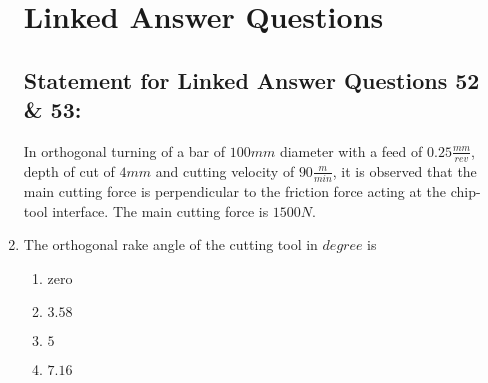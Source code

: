 \documentclass[journal]{IEEEtran}
\numberwithin{equation}{enumi}
\numberwithin{figure}{enumi}
\begin{document}
\begin{enumerate}
    \section{Linked Answer Questions}
    \subsection{Statement for Linked Answer Questions 52 \& 53:}
    In orthogonal turning of a bar of $100 mm$ diameter with a feed of $0.25 \frac{mm}{rev}$, depth of cut of $4 mm$ and cutting velocity of $90 \frac{m}{min}$, it is observed that the main  cutting force is perpendicular to the friction force acting at the chip-tool interface. The main  cutting force is $1500 N$.\\

    \item 
    The orthogonal rake angle of the cutting tool in $degree$ is
    \begin{multicols}{4}
        \begin{enumerate}
            \item zero
            \item $3.58$
            \item $5$
            \item $7.16$
        \end{enumerate}
    \end{multicols}

\end{enumerate}
\end{document}
